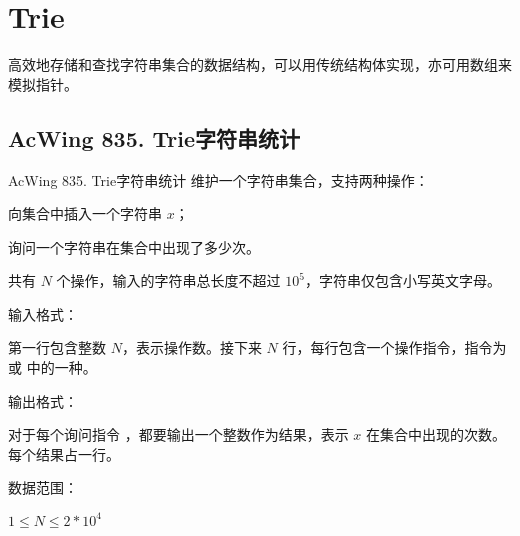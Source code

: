\begin{mycpptwocol}[KMP]

\end{mycpptwocol}


\section{Trie}
高效地存储和查找字符串集合的数据结构，可以用传统结构体实现，亦可用数组来模拟指针。

\subsection{AcWing 835. Trie字符串统计}

\begin{titledbox}{AcWing 835. Trie字符串统计}
    维护一个字符串集合，支持两种操作：
    \begin{myenum}
        \item {} 向集合中插入一个字符串 $x$；
        \item {} 询问一个字符串在集合中出现了多少次。
    \end{myenum}

    共有 $N$ 个操作，输入的字符串总长度不超过 $10^5$，字符串仅包含小写英文字母。

    输入格式：

    第一行包含整数 $N$，表示操作数。接下来 $N$ 行，每行包含一个操作指令，指令为  或  中的一种。

    输出格式：

    对于每个询问指令 ，都要输出一个整数作为结果，表示 $x$ 在集合中出现的次数。
    每个结果占一行。

    数据范围：

    $1 \le N \le 2*10^4$

    \begin{inputblock}
         \\
         \\
         \\
         \\
         \\
    \end{inputblock}
    \begin{outputblock}
         \\
         \\
    \end{outputblock}
\end{titledbox}

